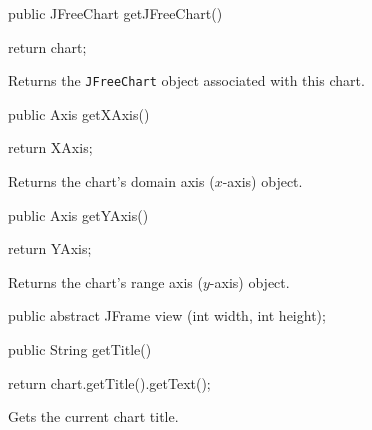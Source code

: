 \begin{code}

   public JFreeChart getJFreeChart() \begin{hide} {
      return chart;
   }\end{hide}
\end{code}
\begin{tabb}
   Returns the \texttt{JFreeChart} object associated with this chart.
\end{tabb}
\begin{htmlonly}
\end{htmlonly}
\begin{code}

   public Axis getXAxis() \begin{hide} {
      return XAxis;
   }\end{hide}
\end{code}
\begin{tabb}
   Returns the chart's domain axis ($x$-axis) object.
\end{tabb}
\begin{htmlonly}
\end{htmlonly}
\begin{code}

   public Axis getYAxis() \begin{hide} {
      return YAxis;
   }\end{hide}
\end{code}
\begin{tabb}
   Returns the chart's range axis ($y$-axis) object.
\end{tabb}
\begin{htmlonly}
\end{htmlonly}
\begin{code}

   public abstract JFrame view (int width, int height);
\end{code}
\begin{code}

   public String getTitle() \begin{hide} {
      return chart.getTitle().getText();
   }\end{hide}
\end{code}
\begin{tabb}
   Gets the current chart title.
\end{tabb}
\begin{htmlonly}
\end{htmlonly}
